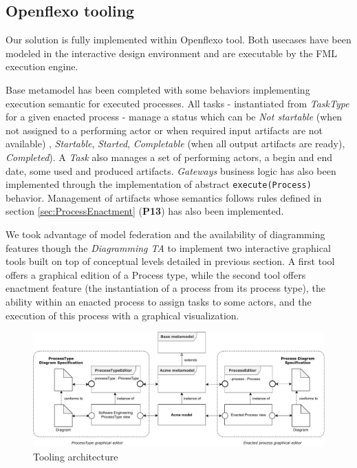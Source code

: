\subsection{Openflexo tooling}
\label{subsec:tooling}

Our solution is fully implemented within Openflexo tool. Both usecases have been modeled in the interactive design environment and are executable by the FML execution engine.

Base metamodel has been completed with some behaviors implementing execution semantic for executed processes. All tasks - instantiated from \textit{TaskType} for a given enacted process - manage a status which can be \textit{Not startable} (when not assigned to a performing actor or when required input artifacts are not available) , \textit{Startable}, \textit{Started}, \textit{Completable} (when all output artifacts are ready), \textit{Completed}). A \textit{Task} also manages a set of performing actors, a begin and end date, some used and produced artifacts. \textit{Gateways} business logic has also been implemented through the implementation of abstract \texttt{execute(Process)} behavior. Management of artifacts whose semantics follows rules defined in section \ref{sec:ProcessEnactment} (\textbf{P13}) has also been implemented.

We took advantage of model federation and the availability of diagramming features though the \textit{Diagramming TA} to implement two interactive graphical tools built on top of conceptual levels detailed in previous section. A first tool offers a graphical edition of a Process type, while the second tool offers enactment feature (the instantiation of a process from its process type), the ability within an enacted process to assign tasks to some actors, and the execution of this process with a graphical visualization.

\begin{figure}
 \centering
     \includegraphics[width=0.9 \textwidth]{Figures/ToolingArchitecture.pdf}
     \caption{Tooling architecture}
    \label{fig:ToolingArchitecture}
\end{figure}


